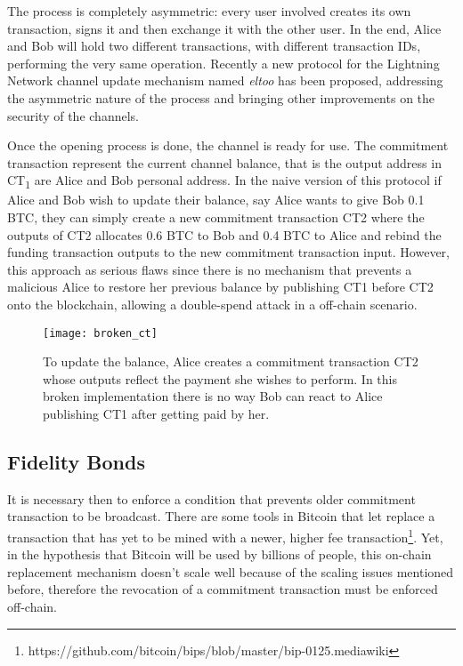 		The process is completely asymmetric: every user involved creates its own transaction, signs it and then exchange it with the other user. In the end, Alice and Bob will hold two different transactions, with different transaction IDs, performing the very same operation. Recently a new protocol for the Lightning Network channel update mechanism named \textit{eltoo}\cite{Decker} has been proposed, addressing the asymmetric nature of the process and bringing other improvements on the security of the channels.
		
		Once the opening process is done, the channel is ready for use. The commitment transaction represent the current channel balance, that is the output address in CT\textsubscript{1} are Alice and Bob personal address. In the naive version of this protocol if Alice and Bob wish to update their balance, say Alice wants to give Bob 0.1 BTC, they can simply create a new commitment transaction CT2 where the outputs of CT2 allocates 0.6 BTC to Bob and 0.4 BTC to Alice and rebind the funding transaction outputs to the new commitment transaction input. However, this approach as serious flaws since there is no mechanism that prevents a malicious Alice to restore her previous balance by publishing CT1 before CT2 onto the blockchain, allowing a double-spend attack in a off-chain scenario.
		
		\begin{figure}
			\texttt{[image: broken\_ct]}
			\centering
			\caption{To update the balance, Alice creates a commitment transaction CT2 whose outputs reflect the payment she wishes to perform. In this broken implementation there is no way Bob can react to Alice publishing CT1 after getting paid by her.}
		\end{figure}
		
		\subsection{Fidelity Bonds}
		
		It is necessary then to enforce a condition that prevents older commitment transaction to be broadcast. There are some tools in Bitcoin that let replace a transaction that has yet to be mined with a newer, higher fee transaction\footnote{https://github.com/bitcoin/bips/blob/master/bip-0125.mediawiki}. Yet, in the hypothesis that Bitcoin will be used by billions of people, this on-chain replacement mechanism doesn't scale well because of the scaling issues mentioned before, therefore the revocation of a commitment transaction must be enforced off-chain.
		

